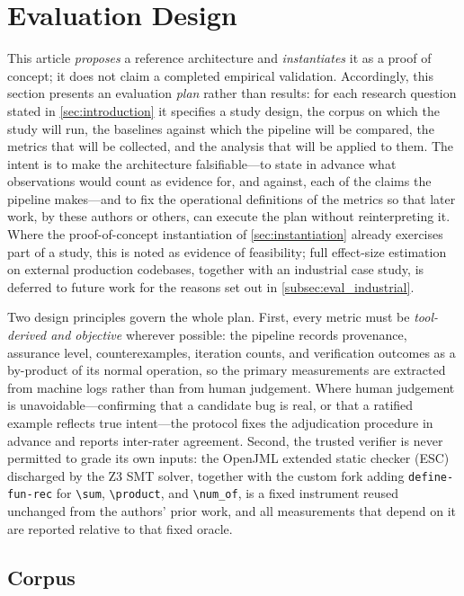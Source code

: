 \section{Evaluation Design}\label{sec:evaluation_plan}

This article \emph{proposes} a reference architecture and \emph{instantiates} it as a proof of concept; it does not claim a completed empirical validation. Accordingly, this section presents an evaluation \emph{plan} rather than results: for each research question stated in \cref{sec:introduction} it specifies a study design, the corpus on which the study will run, the baselines against which the pipeline will be compared, the metrics that will be collected, and the analysis that will be applied to them. The intent is to make the architecture falsifiable---to state in advance what observations would count as evidence for, and against, each of the claims the pipeline makes---and to fix the operational definitions of the metrics so that later work, by these authors or others, can execute the plan without reinterpreting it. Where the proof-of-concept instantiation of \cref{sec:instantiation} already exercises part of a study, this is noted as evidence of feasibility; full effect-size estimation on external production codebases, together with an industrial case study, is deferred to future work for the reasons set out in \cref{subsec:eval_industrial}.

Two design principles govern the whole plan. First, every metric must be \emph{tool-derived and objective} wherever possible: the pipeline records provenance, assurance level, counterexamples, iteration counts, and verification outcomes as a by-product of its normal operation, so the primary measurements are extracted from machine logs rather than from human judgement. Where human judgement is unavoidable---confirming that a candidate bug is real, or that a ratified example reflects true intent---the protocol fixes the adjudication procedure in advance and reports inter-rater agreement. Second, the trusted verifier is never permitted to grade its own inputs: the OpenJML extended static checker (ESC) discharged by the Z3 SMT solver, together with the custom fork adding \texttt{define-fun-rec} for \verb|\sum|, \verb|\product|, and \verb|\num_of|, is a fixed instrument reused unchanged from the authors' prior work, and all measurements that depend on it are reported relative to that fixed oracle.

\subsection{Corpus}\label{subsec:eval_corpus}

